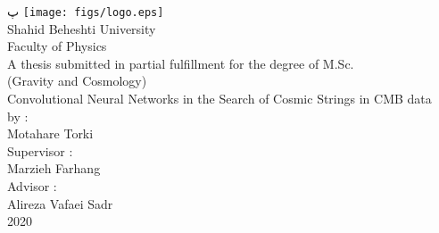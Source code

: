 \documentclass[a4paper,titlepage,12pt,fleqn,oneside]{report}
\begin{document}
\begin{titlepage}
\begin{latin}
   \begin{center}پ
      \texttt{[image: figs/logo.eps]}\\
      \vspace{0.2cm}
      {\Large Shahid Beheshti University}\\
      {\Large Faculty of Physics}\\
      \vspace{1.3cm}
      {A thesis submitted in partial fulfillment for the degree of M.Sc.}\\
      {(Gravity and Cosmology)}\\
      \vspace{0.7cm}
      {\LARGE
         Convolutional Neural Networks in the Search of Cosmic Strings in CMB data} \\

      \vspace{0.5cm}
      {\Large by :}\\
      {\Large Motahare Torki}\\
      \vspace{0.5cm}
      {\Large Supervisor :}\\
      {\Large Marzieh Farhang}\\
      \vspace{0.5cm}
      {\Large Advisor :}\\
      {\Large Alireza Vafaei Sadr}\\
      \vspace{0.5cm}
      {\Large 2020} \\
      \vspace{0.5cm}
   \end{center}
\end{latin}
\end{titlepage}

\end{document}
